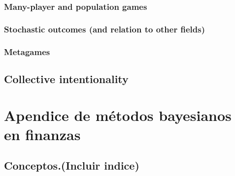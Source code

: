         \subsection{Many-player and population games}
        \subsection{Stochastic outcomes (and relation to other fields)}
        \subsection{Metagames}
    \section{Collective intentionality}
        
\chapter{Apendice de métodos bayesianos en finanzas}
    \section{Conceptos.(Incluir indice)}